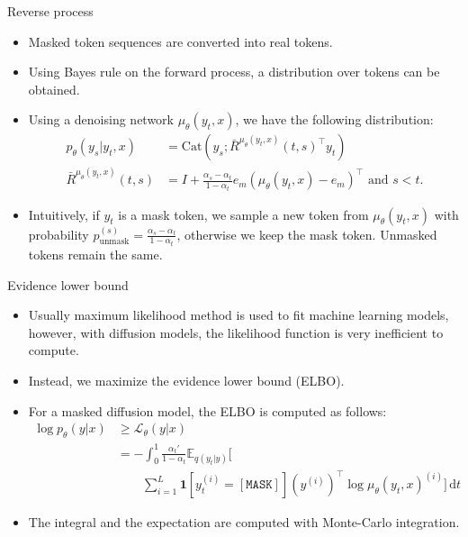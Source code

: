 \documentclass[normaltitle,first=orange,second=red,leqno]{aaltoslides}
\begin{document}
\begin{frame}{Reverse process}
    \begin{itemize}
        \item<1-> Masked token sequences are converted into real tokens.
        \item<2-> Using Bayes rule on the forward process, a distribution over tokens can be obtained.
        \item<3-> Using a denoising network $\mu_\theta(y_t, x)$, we have the following distribution:
        \begin{align*}
            p_\theta(y_s | y_t, x) &= \text{Cat}(y_s; \bar{R}^{\mu_\theta(y_t, x)}(t, s)^\top y_t) \\
            \bar{R}^{\mu_\theta(y_t, x)}(t, s) &= I + \frac{\alpha_s - \alpha_t}{1 - \alpha_t}e_m(\mu_\theta(y_t, x) - e_m)^\top \text{ and } s < t.
        \end{align*}
        \item<4-> Intuitively, if $y_t$ is a mask token, we sample a new token from $\mu_\theta(y_t, x)$ with probability $p_{\text{unmask}}^{(s)} = \frac{\alpha_s - \alpha_t}{1 - \alpha_t}$, otherwise we keep the mask token. Unmasked tokens remain the same.
    \end{itemize}
\end{frame}

\begin{frame}{Evidence lower bound}
    \begin{itemize}
        \item<1-> Usually maximum likelihood method is used to fit machine learning models, however, with diffusion models, the likelihood function is very inefficient to compute.
        \item<2-> Instead, we maximize the evidence lower bound (ELBO).
        \item<3-> For a masked diffusion model, the ELBO is computed as follows:
        \begin{align*}
            \log p_\theta(y | x) &\ge \mathcal{L}_\theta(y | x) \\
            &= -\int_{0}^{1} \frac{\alpha_t'}{1 - \alpha_t} \mathbb{E}_{q(y_t | y)} \Biggl[ \\
            &\qquad \sum_{i=1}^{L} \mathbf{1}[y_t^{(i)} = [\mathtt{MASK}]] (y^{(i)})^\top \log\mu_\theta(y_t, x)^{(i)} \Biggr] \, \mathrm{d}t
        \end{align*}
        \item<4-> The integral and the expectation are computed with Monte-Carlo integration.
    \end{itemize}
\end{frame}
\end{document}
